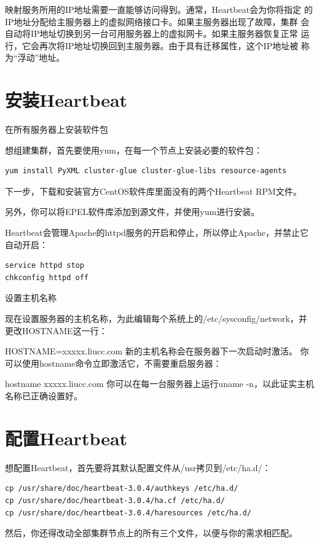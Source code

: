 映射服务所用的IP地址需要一直能够访问得到。通常，Heartbeat会为你将指定
的IP地址分配给主服务器上的虚拟网络接口卡。如果主服务器出现了故障，集群
会自动将IP地址切换到另一台可用服务器上的虚拟网卡。如果主服务器恢复正常
运行，它会再次将IP地址切换回到主服务器。由于具有迁移属性，这个IP地址被
称为“浮动”地址。

\section{安装Heartbeat}

在所有服务器上安装软件包

想组建集群，首先要使用yum，在每一个节点上安装必要的软件包：

\begin{verbatim}
yum install PyXML cluster-glue cluster-glue-libs resource-agents
\end{verbatim}

下一步，下载和安装官方CentOS软件库里面没有的两个Heartbeat RPM文件。

另外，你可以将EPEL软件库添加到源文件，并使用yum进行安装。

Heartbeat会管理Apache的httpd服务的开启和停止，所以停止Apache，并禁止它自动开启：

\begin{verbatim}
service httpd stop
chkconfig httpd off
\end{verbatim}

设置主机名称

现在设置服务器的主机名称，为此编辑每个系统上的/etc/sysconfig/network，并更改HOSTNAME这一行：

HOSTNAME=xxxxx.liucc.com 新的主机名称会在服务器下一次启动时激活。
你可以使用hostname命令立即激活它，不需要重启服务器：

hostname xxxxx.liucc.com 你可以在每一台服务器上运行uname -n，以此证实主机名称已正确设置好。

\section{配置Heartbeat}

想配置Heartbeat，首先要将其默认配置文件从/usr拷贝到/etc/ha.d/：

\begin{verbatim}
cp /usr/share/doc/heartbeat-3.0.4/authkeys /etc/ha.d/
cp /usr/share/doc/heartbeat-3.0.4/ha.cf /etc/ha.d/
cp /usr/share/doc/heartbeat-3.0.4/haresources /etc/ha.d/
\end{verbatim}

然后，你还得改动全部集群节点上的所有三个文件，以便与你的需求相匹配。


